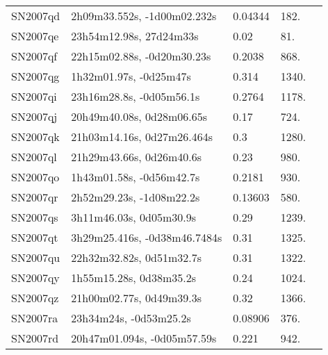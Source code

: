 \begin{longtable}{lllll}
         SN2007qd &    2h09m33.552s, -1d00m02.232s &  0.04344 &           182. &    \citet{2016SDSSD.C...0000:} \\
         SN2007qe &        23h54m12.98s, 27d24m33s &     0.02 &            81. &    \citet{2007CBET.1176A...1G} \\
         SN2007qf &     22h15m02.88s, -0d20m30.23s &   0.2038 &           868. &    \citet{2011ApJ...740...92G} \\
         SN2007qg &         1h32m01.97s, -0d25m47s &    0.314 &          1340. &    \citet{2010ApJ...713.1026D} \\
         SN2007qi &       23h16m28.8s, -0d05m56.1s &   0.2764 &          1178. &    \citet{2011ApJ...740...92G} \\
         SN2007qj &      20h49m40.08s, 0d28m06.65s &     0.17 &           724. &    \citet{2007CBET.1139A...1B} \\
         SN2007qk &     21h03m14.16s, 0d27m26.464s &      0.3 &          1280. &    \citet{2007CBET.1139A...1B} \\
         SN2007ql &       21h29m43.66s, 0d26m40.6s &     0.23 &           980. &    \citet{2007CBET.1139A...1B} \\
         SN2007qo &       1h43m01.58s, -0d56m42.7s &   0.2181 &           930. &    \citet{2011ApJ...740...92G} \\
         SN2007qr &       2h52m29.23s, -1d08m22.2s &  0.13603 &           580. &    \citet{2003SDSS1.C...0000:} \\
         SN2007qs &        3h11m46.03s, 0d05m30.9s &     0.29 &          1239. &    \citet{2007CBET.1139A...1B} \\
         SN2007qt &   3h29m25.416s, -0d38m46.7484s &     0.31 &          1325. &    \citet{2007CBET.1139A...1B} \\
         SN2007qu &       22h32m32.82s, 0d51m32.7s &     0.31 &          1322. &    \citet{2007CBET.1139A...1B} \\
         SN2007qy &        1h55m15.28s, 0d38m35.2s &     0.24 &          1024. &    \citet{2007CBET.1139A...1B} \\
         SN2007qz &       21h00m02.77s, 0d49m39.3s &     0.32 &          1366. &    \citet{2007CBET.1139A...1B} \\
         SN2007ra &         23h34m24s, -0d53m25.2s &  0.08906 &           376. &    \citet{2001SDSSe.1...0000:} \\
         SN2007rd &    20h47m01.094s, -0d05m57.59s &    0.221 &           942. &    \citet{2011ApJ...738..162S} \\

\end{longtable}
